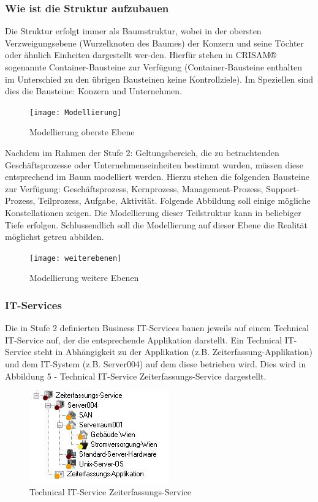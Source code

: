 \subsubsection{Wie ist die Struktur aufzubauen}
Die Struktur erfolgt immer als Baumstruktur, wobei in der obersten Verzweigungsebene (Wurzelknoten des Baumes) der Konzern und seine Töchter oder ähnlich Einheiten dargestellt wer-den. Hierfür stehen in CRISAM® sogenannte Container-Bausteine zur Verfügung (Container-Bausteine enthalten im Unterschied zu den übrigen Bausteinen keine Kontrollziele). Im Speziellen sind dies die Bausteine: Konzern und Unternehmen.

\begin{figure}[htbp]
	\centering
	\texttt{[image: Modellierung]}
	\caption{Modellierung oberste Ebene}
	\label{fig:bsp}
\end{figure}
Nachdem im Rahmen der Stufe 2: Geltungsbereich, die zu betrachtenden Geschäftsprozesse oder Unternehmenseinheiten bestimmt wurden, müssen diese entsprechend im Baum modelliert werden. Hierzu stehen die folgenden Bausteine zur Verfügung: Geschäftsprozess, Kernprozess, Management-Prozess, Support-Prozess, Teilprozess, Aufgabe, Aktivität.
Folgende Abbildung soll einige mögliche Konstellationen zeigen. Die Modellierung dieser Teilstruktur kann in beliebiger Tiefe erfolgen. Schlussendlich soll die Modellierung auf dieser Ebene die Realität möglichst getreu abbilden.

\begin{figure}[htbp]
	\centering
	\texttt{[image: weiterebenen]}
	\caption{Modellierung weitere Ebenen}
	\label{fig:bsp}
\end{figure}

\subsubsection{IT-Services}
Die in Stufe 2 definierten Business IT-Services bauen jeweils auf einem Technical IT-Service auf, der die entsprechende Applikation darstellt. Ein Technical IT-Service steht in Abhängigkeit zu der Applikation (z.B. Zeiterfassung-Applikation) und dem IT-System (z.B. Server004) auf dem diese betrieben wird. Dies wird in Abbildung 5 - Technical IT-Service Zeiterfassungs-Service dargestellt.
\newpage
\begin{figure}[htbp]
	\centering
	\includegraphics[scale =1 ]{Technical}
	\caption{Technical IT-Service Zeiterfassungs-Service}
	\label{fig:bsp}
\end{figure}
